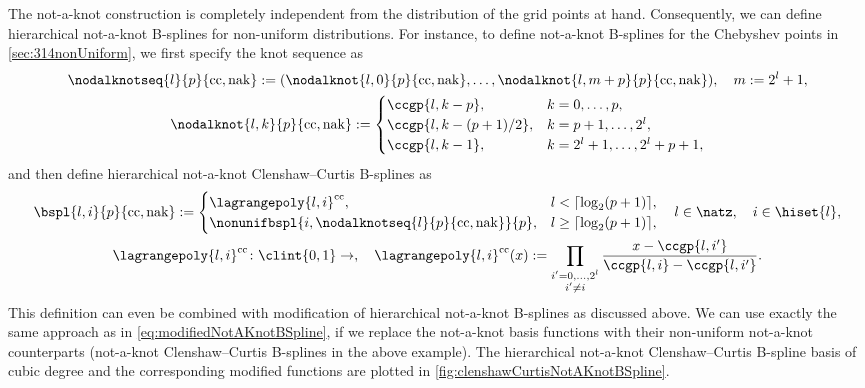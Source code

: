 The not-a-knot construction is completely independent from the
distribution of the grid points at hand.
Consequently, we can define hierarchical not-a-knot B-splines
for non-uniform distributions.
For instance, to define not-a-knot B-splines for the
Chebyshev points in \cref{sec:314nonUniform},
we first specify the knot sequence as
\begin{subequations}
  \begin{gather}
    \nodalknotseq{l}{p}{\cc,\nak}
    := (\nodalknot{l,0}{p}{\cc,\nak}, \dotsc,
    \nodalknot{l,m+p}{p}{\cc,\nak}),\quad
    m := 2^l + 1,\\
    \nodalknot{l,k}{p}{\cc,\nak}
    :=
    \begin{cases}
      \ccgp{l,k-p},&
      k = 0, \dotsc, p,\\
      \ccgp{l,k-(p+1)/2},&
      k = p + 1, \dotsc, 2^l,\\
      \ccgp{l,k-1},&
      k = 2^l + 1, \dotsc, 2^l + p + 1,
    \end{cases}
  \end{gather}
\end{subequations}
and then define hierarchical not-a-knot Clenshaw--Curtis B-splines as
\begin{subequations}
  \begin{gather}
    \bspl{l,i}{p}{\cc,\nak}
    :=
    \begin{cases}
      \lagrangepoly{l,i}^\cc,&
      l < \lceil\log_2(p+1)\rceil,\\
      \nonunifbspl{i,\nodalknotseq{l}{p}{\cc,\nak}}{p},&
      l \ge \lceil\log_2(p+1)\rceil,
    \end{cases}\quad
    l \in \natz,\quad
    i \in \hiset{l},\\
    \lagrangepoly{l,i}^\cc\colon \clint{0, 1} \to \real,\quad
    \lagrangepoly{l,i}^\cc(x)
    := \prod_{\substack{i'=0,\dotsc,2^l\\i'\not=i}}
    \frac{x - \ccgp{l,i'}}%
    {\ccgp{l,i} - \ccgp{l,i'}}.
  \end{gather}
\end{subequations}
This definition can even be combined with modification
of hierarchical not-a-knot B-splines as discussed above.
We can use exactly the same approach as in
\eqref{eq:modifiedNotAKnotBSpline}, if we replace the
not-a-knot basis functions with their non-uniform not-a-knot counterparts
(not-a-knot Clenshaw--Curtis B-splines in the above example).
The hierarchical not-a-knot Clenshaw--Curtis B-spline basis of
cubic degree and the corresponding modified functions are plotted in
\cref{fig:clenshawCurtisNotAKnotBSpline}.

